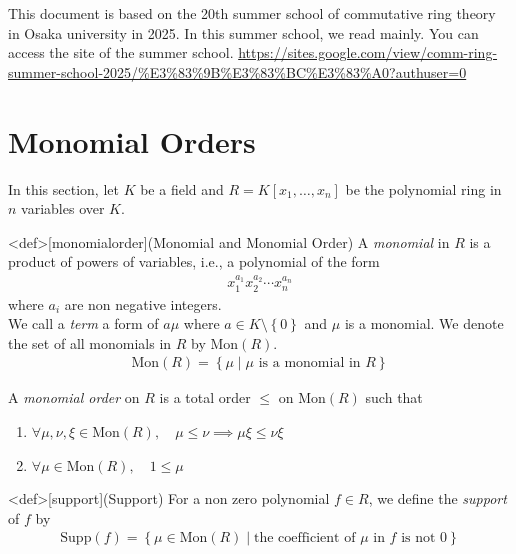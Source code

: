 \documentclass{article}
\renewcommand{\mid}{\middle|}
\begin{document}
This document is based on the 20th summer school of commutative ring theory in Osaka university in 2025. In this summer school, we read \cite{Bruns2022} mainly. You can access the site of the summer school. \url{https://sites.google.com/view/comm-ring-summer-school-2025/%E3%83%9B%E3%83%BC%E3%83%A0?authuser=0}

\newpage

\section{Monomial Orders}
In this section, let $K$ be a field and $R = K[x_1, \ldots, x_n]$ be the polynomial ring in $n$ variables over $K$.

\begin{statementsp}<def>[monomialorder](Monomial and Monomial Order)
    A \textit{monomial} in $R$ is a product of powers of variables, i.e., a polynomial of the form
    \begin{align}
        x_1^{a_1} x_2^{a_2} \cdots x_n^{a_n}
    \end{align}
    where $a_i$ are non negative integers. \\ 
    We call a \textit{term} a form of $a \mu$ where $a \in K \setminus \left\{ 0 \right\}$ and $\mu$ is a monomial. We denote the set of all monomials in $R$ by $\mathrm{Mon}(R)$. 
    \begin{align}
        \mathrm{Mon}(R) = \left\{ \mu \mid \mu \text{ is a monomial in } R \right\}
    \end{align}

    A \textit{monomial order} on $R$ is a total order $\leq$ on $\mathrm{Mon}(R)$ such that 
    \begin{enumerate}
        \item $\forall \mu, \nu, \xi \in \mathrm{Mon}(R), \quad \mu \leq \nu \implies \mu \xi \leq \nu \xi$
        \item $\forall \mu \in \mathrm{Mon}(R), \quad 1 \leq \mu$
    \end{enumerate}
\end{statementsp}

\begin{statementsp}<def>[support](Support)
    For a non zero polynomial $f \in R$, we define the \textit{support} of $f$ by
    \begin{align}
        \mathrm{Supp}(f) = \left\{ \mu \in \mathrm{Mon}(R) \mid \text{the coefficient of } \mu \text{ in } f \text{ is not } 0 \right\}
    \end{align}
\end{statementsp}
\end{document}

